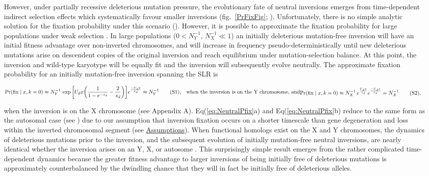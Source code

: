 \documentclass[11pt]{article}
\newcommand\numberthis{\addtocounter{equation}{1}\tag{\theequation}}
\begin{document}
However, under partially recessive deleterious mutation pressure, the evolutionary fate of neutral inversions emerges from time-dependent indirect selection effects which systematically favour smaller inversions (fig.~\ref{PrFixFig}; \cite[see][]{Olito-etal-2022}). Unfortunately, there is no simple analytic solution for the fixation probability under this scenario (\citealt{OhtaKojima1968, KimuraOhta1970, UeckerHermisson2011, Waxman2011}). However, it is possible to approximate the fixation probability for large populations under weak selection \citep{ConnallonOlito2021}. In large populations ($0 < N_Y^{-1},\, N_X^{-1} \ll 1$) an initially deleterious mutation-free inversion will have an initial fitness advantage over non-inverted chromosomes, and will increase in frequency pseudo-deterministically until new deleterious mutations arise on descendent copies of the original inversion and reach equilibrium under mutation-selection balance. At this point, the inversion and wild-type karyotype will be equally fit and the inversion will subsequently evolve neutrally. The approximate fixation probability for an initially mutation-free inversion spanning the SLR is

\begin{subequations}\label{eq:NeutralPfix}
	\begin{align*}
		\Pr(\text{fix} \mid x, k = 0) &\approx N^{-1}_Y \, \exp \bigg[ U_d x \bigg( \frac{1}{1 - e^{-s_d} } - \frac{2}{s_d} \bigg) \bigg] e^{\frac{-U_d x}{s_d}} \approx N^{-1}_Y \numberthis,
	\end{align*}
	\text{when the inversion is on the Y chromosome, and}
	\begin{align*}
		\Pr(\text{fix} \mid x, k = 0)&\approx N^{-1}_X \, e^{\frac{U_d x}{s_d}} e^{\frac{-U_d x}{s_d}} = N^{-1}_X \numberthis, 
	\end{align*}
\end{subequations}

\noindent when the inversion is on the X chromosome (see Appendix A). Eq(\ref{eq:NeutralPfix}a) and Eq(\ref{eq:NeutralPfix}b) reduce to the same form as the autosomal case (see \citealt{Nei1967, ConnallonOlito2021}) due to our assumption that inversion fixation occurs on a shorter timescale than gene degeneration and loss within the inverted chromosomal segment (see \hyperref[sec:assumptions]{Assumptions}). When functional homologs exist on the X and Y chromosomes, the dynamics of deleterious mutations prior to the inversion, and the subsequent evolution of initially mutation-free neutral inversions, are nearly identical whether the inversion arises on an Y, X, or autosome \citet{ConnallonOlito2021}. This surprisingly simple result emerges from the rather complicated time-dependent dynamics because the greater fitness advantage to larger inversions of being initially free of deleterious mutations is approximately counterbalanced by the dwindling chance that they will in fact be initially free of deleterious alleles. \vspace{12pt}
\end{document}
